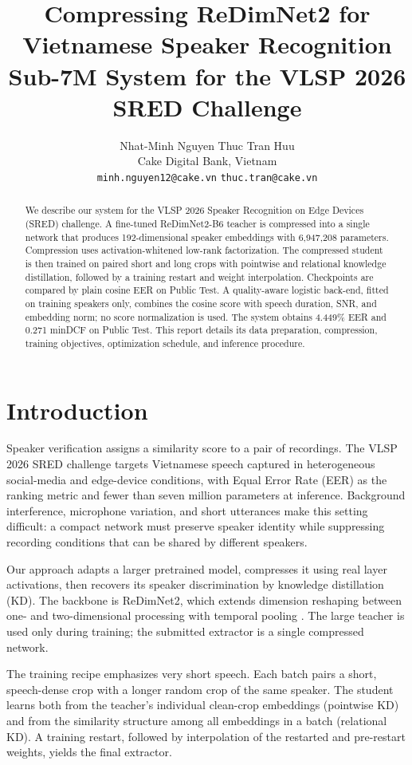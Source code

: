 \documentclass[11pt]{article}
\title{Compressing ReDimNet2 for Vietnamese Speaker Recognition\\ Sub-7M System for the VLSP 2026 SRED Challenge}
\author{Nhat-Minh Nguyen \qquad Thuc Tran Huu \\
Cake Digital Bank, Vietnam \\
\texttt{minh.nguyen12@cake.vn} \quad \texttt{thuc.tran@cake.vn}}
\begin{document}
\maketitle
\begin{abstract}
We describe our system for the VLSP 2026 Speaker Recognition on Edge Devices (SRED) challenge. A fine-tuned ReDimNet2-B6 teacher is compressed into a single network that produces 192-dimensional speaker embeddings with 6,947,208 parameters. Compression uses activation-whitened low-rank factorization. The compressed student is then trained on paired short and long crops with pointwise and relational knowledge distillation, followed by a training restart and weight interpolation. Checkpoints are compared by plain cosine EER on Public Test. A quality-aware logistic back-end, fitted on training speakers only, combines the cosine score with speech duration, SNR, and embedding norm; no score normalization is used. The system obtains 4.449\% EER and 0.271 minDCF on Public Test. This report details its data preparation, compression, training objectives, optimization schedule, and inference procedure.
\end{abstract}

\section{Introduction}
Speaker verification assigns a similarity score to a pair of recordings. The VLSP 2026 SRED challenge targets Vietnamese speech captured in heterogeneous social-media and edge-device conditions, with Equal Error Rate (EER) as the ranking metric and fewer than seven million parameters at inference. Background interference, microphone variation, and short utterances make this setting difficult: a compact network must preserve speaker identity while suppressing recording conditions that can be shared by different speakers.

Our approach adapts a larger pretrained model, compresses it using real layer activations, then recovers its speaker discrimination by knowledge distillation (KD). The backbone is ReDimNet2, which extends dimension reshaping between one- and two-dimensional processing with temporal pooling \citep{yakovlev2026redimnet2}. The large teacher is used only during training; the submitted extractor is a single compressed network.

The training recipe emphasizes very short speech. Each batch pairs a short, speech-dense crop with a longer random crop of the same speaker. The student learns both from the teacher's individual clean-crop embeddings (pointwise KD) and from the similarity structure among all embeddings in a batch (relational KD). A training restart, followed by interpolation of the restarted and pre-restart weights, yields the final extractor.
\end{document}
